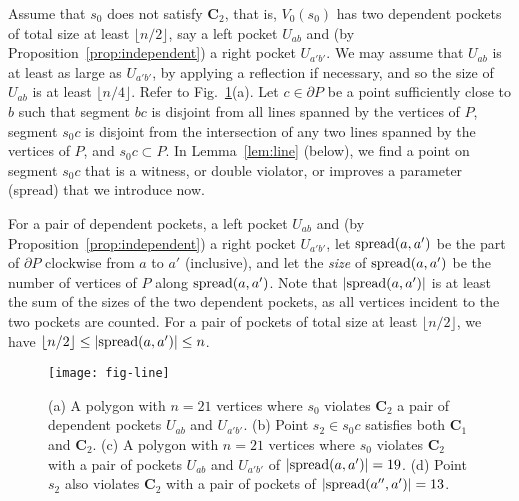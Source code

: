 \documentclass[12pt]{article}
\newcommand{\spread}{{\rm spread}}
\newcommand{\floor}[1]{{\lfloor #1 \rfloor}}
\begin{document}
Assume that $s_0$ does not satisfy $\mathbf{C}_2$, that is, $V_0(s_0)$ has two dependent pockets of total size at least $\floor{n/2}$, say a left pocket $U_{ab}$ and (by Proposition~\ref{prop:independent}) a right pocket $U_{a'b'}$. We may assume that $U_{ab}$ is at least as large as $U_{a'b'}$, by applying a reflection if necessary, and so the size of $U_{ab}$ is at least $\floor{n/4}$. Refer to Fig.~\ref{fig:line}(a). Let $c\in \partial P$ be a point sufficiently close to $b$ such that segment $bc$ is disjoint from all lines spanned by the vertices of $P$, segment $s_0c$ is disjoint from the intersection of any two lines spanned by the vertices of $P$, and $s_0c\subset P$. In Lemma~\ref{lem:line} (below), we find a point on segment $s_0c$ that is a witness, or double violator, or improves a parameter (spread) that we introduce now.

For a pair of dependent pockets, a left pocket $U_{ab}$ and (by Proposition~\ref{prop:independent}) a right pocket $U_{a'b'}$, let $\spread(a,a')$ be the part of $\partial P$ clockwise from $a$ to $a'$ (inclusive), and let the \emph{size} of $\spread(a,a')$ be the number of vertices of $P$ along $\spread(a,a')$. Note that
$|\spread(a,a')|$ is at least the sum of the sizes of the two dependent pockets, as all vertices incident to the two pockets are counted. For a pair of pockets of total size at least $\floor{n/2}$, we have $\floor{n/2}\leq |\spread(a,a')|\leq n$.

\begin{figure}[htbp]
  \centering
  \texttt{[image: fig-line]}
  \caption{\label{fig:line}
(a) A polygon with $n=21$ vertices where $s_0$ violates $\mathbf{C}_2$ a pair of dependent
    pockets $U_{ab}$ and $U_{a'b'}$.
(b) Point $s_2\in s_0c$ satisfies both $\mathbf{C}_1$ and $\mathbf{C}_2$.
(c) A polygon with $n=21$ vertices where $s_0$ violates $\mathbf{C}_2$ with
    a pair of pockets $U_{ab}$ and $U_{a'b'}$ of $|\spread(a,a')|=19$.
(d) Point $s_2$ also violates $\mathbf{C}_2$ with a pair of pockets of $|\spread(a'',a')|=13$.}
\end{figure}
\end{document}
